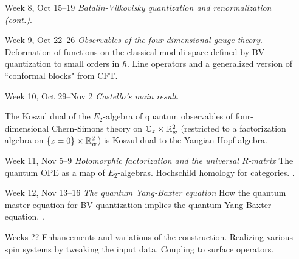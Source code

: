 \documentclass[10pt]{article}
\begin{document}
\begin{itemize}
\item[Week 8, Oct 15--19] {\em Batalin-Vilkovisky quantization and renormalization (cont.)}.

\item[Week 9, Oct 22--26] {\em Observables of the four-dimensional gauge theory}.
Deformation of functions on the classical moduli space defined by BV quantization to small orders in $\hbar$. 
Line operators and a generalized version of ``conformal blocks" from CFT. 
\cite{CosBook, CG2, CosYangian}

\item[Week 10, Oct 29--Nov 2] {\em Costello's main result}.
\begin{thm}
The Koszul dual of the $E_2$-algebra of quantum observables of four-dimensional Chern-Simons theory on $\mathbb C_z \times \mathbb R^2_w$ (restricted to a factorization algebra on $\{z=0\} \times \mathbb R^2_w$) is Koszul dual to the Yangian Hopf algebra. 
\end{thm}
\cite{CosBook, CG2, CosYangian,CWY1,CWY2}

\item[Week 11, Nov 5--9] {\em Holomorphic factorization and the universal $R$-matrix}
The quantum OPE as a map of $E_2$-algebras.
Hochschild homology for categories.
\cite{CosYangian}.

\item[Week 12, Nov 13--16] {\em The quantum Yang-Baxter equation}
How the quantum master equation for BV quantization implies the quantum Yang-Baxter equation.
\cite{CWY1,CWY2}.

\item[Weeks ??] Enhancements and variations of the construction. 
Realizing various spin systems by tweaking the input data. 
Coupling to surface operators. 
\end{itemize} 
\end{document}
